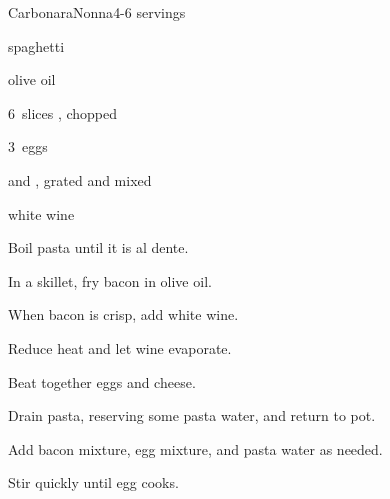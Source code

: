 \begin{recipe}{Carbonara}{Nonna}{4-6 servings}

\begin{ingredients}
\item {} spaghetti
\item {} olive oil
\item 6~slices , chopped
\item 3~eggs
\item \C{\twothird}  and , grated and mixed
\item \C{\half} white wine
\end{ingredients}

\begin{directions}
\item Boil pasta until it is al dente.
\item In a skillet, fry bacon in olive oil.
\item When bacon is crisp, add white wine.
\item Reduce heat and let wine evaporate.
\item Beat together eggs and cheese.
\item Drain pasta, reserving some pasta water, and return to pot.
\item Add bacon mixture, egg mixture, and pasta water as needed.
\item Stir quickly until egg cooks.
\end{directions}

\end{recipe}
